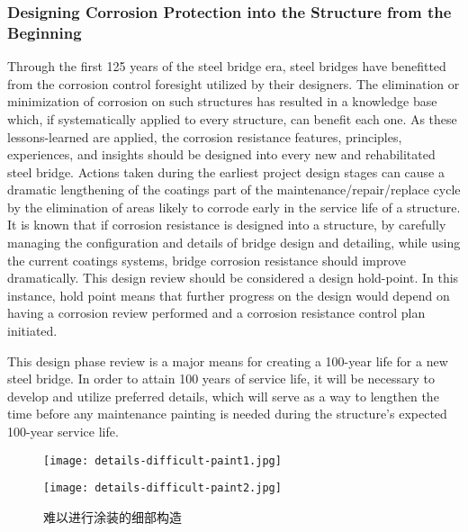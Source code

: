 \subsubsection{Designing Corrosion Protection into the Structure from the Beginning}
Through the first 125 years of the steel bridge era, steel bridges have benefitted from the corrosion control
foresight utilized by their designers. The elimination or minimization of corrosion on such structures has resulted in a
knowledge base which, if systematically applied to every structure, can benefit each one. As these lessons-learned are
applied, the corrosion resistance features, principles, experiences, and insights should be designed into every new and
rehabilitated steel bridge. Actions taken during the earliest project design stages can cause a dramatic lengthening of
the coatings part of the maintenance/repair/replace cycle by the elimination of areas likely to corrode early in the
service life of a structure. It is known that if corrosion resistance is designed into a structure, by carefully managing
the configuration and details of bridge design and detailing, while using the current coatings systems, bridge
corrosion resistance should improve dramatically. This design review should be considered a design hold-point. In this instance, hold point means that further progress on the design would depend on having a corrosion review
performed and a corrosion resistance control plan initiated.

This design phase review is a major means for creating a 100-year life for a new steel bridge. In order to attain
100 years of service life, it will be necessary to develop and utilize preferred details, which will serve as a way to
lengthen the time before any maintenance painting is needed during the structure’s expected 100-year service life.

\begin{figure}
  \begin{minipage}{0.4\linewidth}\centering
    \texttt{[image: details-difficult-paint1.jpg]}
  \end{minipage}
  \begin{minipage}{0.4\linewidth}\centering
    \texttt{[image: details-difficult-paint2.jpg]}
  \end{minipage}
  \caption{难以进行涂装的细部构造}
  \label{fig:details-difficult-paint}
\end{figure}

